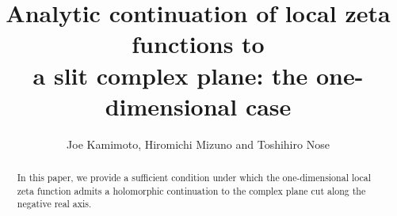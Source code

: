 \documentclass[12pt]{amsart}
\numberwithin{equation}{section}
\theoremstyle{definition}
\theoremstyle{remark}
\newcommand{\1}{{\bf 1}}
\begin{document}
\title[Local zeta functions]
{
Analytic continuation of 
local zeta functions to \\ 
a slit complex plane: 
the one-dimensional case
} 
\author{Joe Kamimoto, Hiromichi Mizuno
and Toshihiro Nose}

\address{Faculty of Mathematics, Kyushu University, 
Motooka 744, Nishi-ku, Fukuoka, 819-0395, Japan} 

\address{Faculty of Science and Engineering, 
Kyushu Sangyo University
3-1 Matsukadai 2-chome, Higashi-ku,
Fukuoka, 813-8503, Japan}

\address{Faculty of Engineering, 
Fukuoka Institute of Technology,
Wajiro-higashi 3-30-1, Higashik-ku,
Fukuoka, 811-0295, Japan}





\begin{abstract}
In this paper, we provide a sufficient condition 
under which the one-dimensional local zeta function 
admits a holomorphic continuation to the complex plane 
cut along the negative real axis.
\end{abstract}

\maketitle



\end{document}
